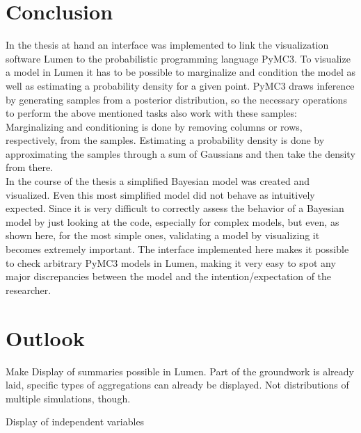 \documentclass{article}
\begin{document}
\section {Conclusion}
In the thesis at hand an interface was implemented to link the visualization software Lumen to the probabilistic programming language PyMC3. To visualize a model in Lumen it has to be possible to marginalize and condition the model as well as estimating a probability density for a given point. PyMC3 draws inference by generating samples from a posterior distribution, so the necessary operations to perform the above mentioned tasks also work with these samples: Marginalizing and conditioning is done by removing columns or rows, respectively, from the samples. Estimating a probability density is done by approximating the samples through a sum of Gaussians and then take the density from there.\\
In the course of the thesis a simplified Bayesian model was created and visualized. Even this most simplified model did not behave as intuitively expected. Since it is very difficult to correctly assess the behavior of a Bayesian model by just looking at the code, especially for complex models, but even, as shown here, for the most simple ones, validating a model by visualizing it becomes extremely important. The interface implemented here makes it possible to check arbitrary PyMC3 models in Lumen, making it very easy to spot any major discrepancies between the model and the intention/expectation of the researcher.

\section{Outlook}
Make Display of summaries possible in Lumen. Part of the groundwork is already laid, specific types of aggregations can already be displayed. Not distributions of multiple simulations, though.

Display of independent variables

\listoffigures
\lstlistoflistings
        


\end{document}

